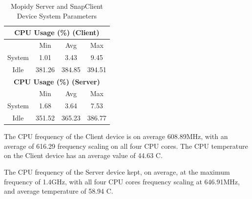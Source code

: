 \documentclass[11pt,a4paper,headinclude=false,footinclude=false]{scrreprt}
\begin{document}
\begin{table}[H]
\begin{tabular}{||c|c|c|c|c|c|c||}
    \multicolumn{7}{|c|}{\textbf{CPU Usage (\%) (Client)}} \\
    \hline\hline
      & \multicolumn{2}{|c|}{Min} & \multicolumn{2}{|c|}{Avg} & \multicolumn{2}{|c|}{Max} \\
    \hline
    System & \multicolumn{2}{|c|}{1.01} & \multicolumn{2}{|c|}{3.43} & \multicolumn{2}{|c|}{9.45} \\
    \hline
    Idle & \multicolumn{2}{|c|}{381.26} & \multicolumn{2}{|c|}{384.85} & \multicolumn{2}{|c|}{394.51} \\
    \hline\hline
    \multicolumn{7}{|c|}{\textbf{CPU Usage (\%) (Server)}} \\
    \hline\hline
      & \multicolumn{2}{|c|}{Min} & \multicolumn{2}{|c|}{Avg} & \multicolumn{2}{|c|}{Max} \\
    \hline
    System & \multicolumn{2}{|c|}{1.68} & \multicolumn{2}{|c|}{3.64} & \multicolumn{2}{|c|}{7.53} \\
    \hline
    Idle & \multicolumn{2}{|c|}{351.52} & \multicolumn{2}{|c|}{365.23} & \multicolumn{2}{|c|}{386.77} \\
    \hline\hline
    \end{tabular}
    \caption{Mopidy Server and SnapClient Device System Parameters}
    \label{MopidyclientserverSysTab}
\end{table}

The CPU frequency of the Client device is on average 608.89MHz, with an
average of 616.29 frequency scaling on all four CPU cores. The CPU
temperature on the Client device has an average value of 44.63
\degree C.

The CPU frequency of the Server device kept, on average, at the maximum
frequency of 1.4GHz, with all four CPU cores frequency scaling at
646.91MHz, and average temperature of 58.94 \degree C.
\end{document}
